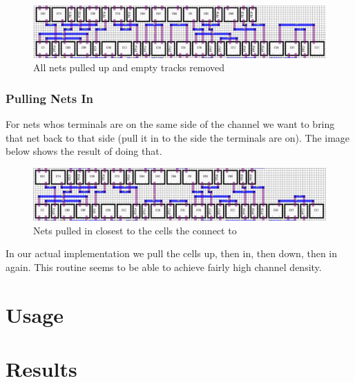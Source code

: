 \documentclass[10pt]{article}
\begin{document}
        \begin{figure}[H]
            \centering
            \includegraphics[width=\linewidth]{./route_4_crop.png}
            \caption{All nets pulled up and empty tracks removed}
        \end{figure}

    \subsubsection{Pulling Nets In}

        For nets whos terminals are on the same side of the channel we want to
        bring that net back to that side (pull it in to the side the terminals are
        on). The image below shows the result of doing that.

            \begin{figure}[H]
                \centering
                \includegraphics[width=\linewidth]{./route_5_crop.png}
                \caption{Nets pulled in closest to the cells the connect to}
            \end{figure}

        In our actual implementation we pull the cells up, then in, then down,
        then in again. This routine seems to be able to achieve fairly high
        channel density.

\newpage
\section{Usage}


\newpage
\section{Results}
\end{document}

